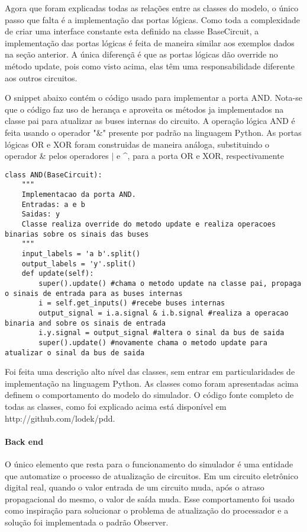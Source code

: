 Agora que foram explicadas todas as relações entre as classes do modelo, o único passo que falta é a implementação das portas lógicas.
Como toda a complexidade de criar uma interface constante esta definido na classe BaseCircuit, a implementação das portas lógicas é feita de maneira similar aos exemplos dados na seção anterior.
A única diferençã é que as portas lógicas dão override no método update, pois como visto acima, elas têm uma responsabilidade diferente aos outros circuitos.

O snippet abaixo contém o código usado para implementar a porta AND.
Nota-se que o código faz uso de herança e aproveita os métodos ja implementados na classe pai para atualizar as buses internas do circuito.
A operação lógica AND é feita usando o operador "\&" presente por padrão na linguagem Python.
As portas lógicas OR e XOR foram construidas de maneira análoga, substituindo o operador \& pelos operadores $|$ e \^{}, para a porta OR e XOR, respectivamente

\begin{lstlisting}
class AND(BaseCircuit):
    """
    Implementacao da porta AND.
    Entradas: a e b
    Saidas: y
    Classe realiza override do metodo update e realiza operacoes binarias sobre os sinais das buses
    """
    input_labels = 'a b'.split()
    output_labels = 'y'.split()
    def update(self):
        super().update() #chama o metodo update na classe pai, propaga o sinais de entrada para as buses internas
        i = self.get_inputs() #recebe buses internas
        output_signal = i.a.signal & i.b.signal #realiza a operacao binaria and sobre os sinais de entrada
        i.y.signal = output_signal #altera o sinal da bus de saida
        super().update() #novamente chama o metodo update para atualizar o sinal da bus de saida
\end{lstlisting}

Foi feita uma descrição alto nível das classes, sem entrar em particularidades de implementação na linguagem Python.
As classes como foram apresentadas acima definem o comportamento do modelo do simulador.
O código fonte completo de todas as classes, como foi explicado acima está disponível em http://github.com/lodek/pdd.

\paragraph{Back end}
O único elemento que resta para o funcionamento do simulador é uma entidade que automatize o processo de atualização de circuitos.
Em um circuito eletrônico digital real, quando o valor entrada de um circuito muda, após o atraso propagacional do mesmo, o valor de saída muda.
Esse comportamento foi usado como inspiração para solucionar o problema de atualização do processador e a solução foi implementada o padrão Observer.

